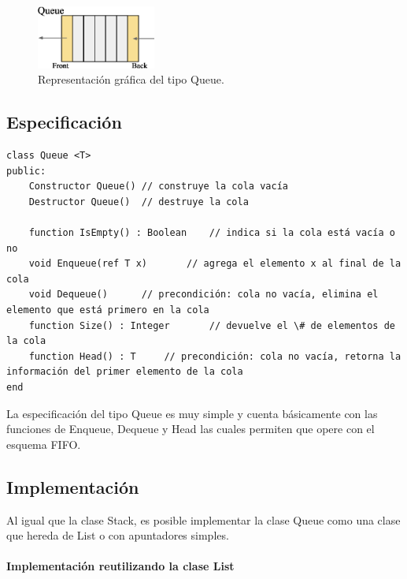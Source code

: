 \begin{figure}[htp!]
  \begin{center}
    \includegraphics[width=0.35\textwidth]{images/queue.eps}
  \end{center}
  \caption{Representación gráfica del tipo Queue.}
  \label{fig:queue}
\end{figure}

\subsection{Especificación}

\begin{lstlisting}[upquote=true, language=pseudo]
class Queue <T>
public:
    Constructor Queue()	// construye la cola vacía
    Destructor Queue()	// destruye la cola

    function IsEmpty() : Boolean	// indica si la cola está vacía o no
    void Enqueue(ref T x)		// agrega el elemento x al final de la cola
    void Dequeue()		// precondición: cola no vacía, elimina el elemento que está primero en la cola
    function Size() : Integer		// devuelve el \# de elementos de la cola
    function Head() : T		// precondición: cola no vacía, retorna la información del primer elemento de la cola
end
\end{lstlisting}

La especificación del tipo Queue es muy simple y cuenta básicamente con las funciones de Enqueue, Dequeue y Head las cuales permiten que opere con el esquema FIFO.

\subsection{Implementación}

Al igual que la clase Stack, es posible implementar la clase Queue como una clase que hereda de List o con apuntadores simples.

\paragraph{Implementación reutilizando la clase List}

